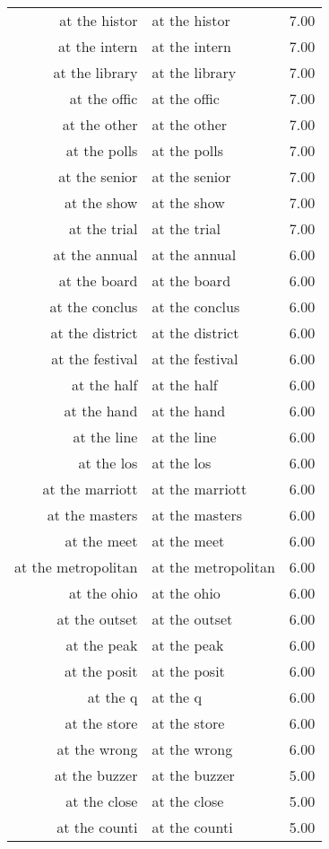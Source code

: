 \begin{table}[ht]
\begin{tabular}{rlr}
  at the histor & at the histor & 7.00 \\ 
  at the intern & at the intern & 7.00 \\ 
  at the library & at the library & 7.00 \\ 
  at the offic & at the offic & 7.00 \\ 
  at the other & at the other & 7.00 \\ 
  at the polls & at the polls & 7.00 \\ 
  at the senior & at the senior & 7.00 \\ 
  at the show & at the show & 7.00 \\ 
  at the trial & at the trial & 7.00 \\ 
  at the annual & at the annual & 6.00 \\ 
  at the board & at the board & 6.00 \\ 
  at the conclus & at the conclus & 6.00 \\ 
  at the district & at the district & 6.00 \\ 
  at the festival & at the festival & 6.00 \\ 
  at the half & at the half & 6.00 \\ 
  at the hand & at the hand & 6.00 \\ 
  at the line & at the line & 6.00 \\ 
  at the los & at the los & 6.00 \\ 
  at the marriott & at the marriott & 6.00 \\ 
  at the masters & at the masters & 6.00 \\ 
  at the meet & at the meet & 6.00 \\ 
  at the metropolitan & at the metropolitan & 6.00 \\ 
  at the ohio & at the ohio & 6.00 \\ 
  at the outset & at the outset & 6.00 \\ 
  at the peak & at the peak & 6.00 \\ 
  at the posit & at the posit & 6.00 \\ 
  at the q & at the q & 6.00 \\ 
  at the store & at the store & 6.00 \\ 
  at the wrong & at the wrong & 6.00 \\ 
  at the buzzer & at the buzzer & 5.00 \\ 
  at the close & at the close & 5.00 \\ 
  at the counti & at the counti & 5.00 \\ 

\end{tabular}
\end{table}
